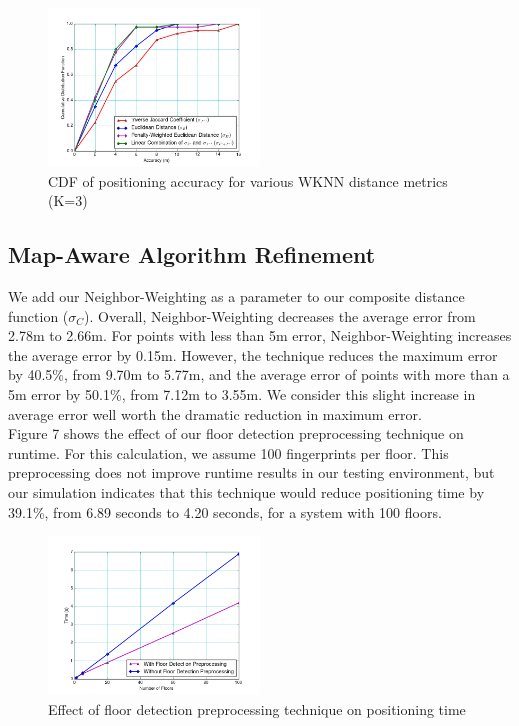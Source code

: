 \documentclass[conference]{IEEEtran}
\begin{document}
\begin{figure}[h!]
  \centering
    \includegraphics[width=0.5\textwidth]{distance_comparison.png}
    \caption{CDF of positioning accuracy for various WKNN distance metrics (K=3)}
\end{figure}


\subsection{Map-Aware Algorithm Refinement}

We add our Neighbor-Weighting as a parameter to our composite distance function ($\sigma_C$). Overall, Neighbor-Weighting decreases the average error from 2.78m to 2.66m. For points with less than 5m error, Neighbor-Weighting increases the average error by 0.15m. However, the technique reduces the maximum error by 40.5\%, from 9.70m to 5.77m, and the average error of points with more than a 5m error by 50.1\%, from 7.12m to 3.55m. We consider this slight increase in average error well worth the dramatic reduction in maximum error.\\		
\indent Figure 7 shows the effect of our floor detection preprocessing technique on runtime. For this calculation, we assume 100 fingerprints per floor. This preprocessing does not improve runtime results in our testing environment, but our simulation indicates that this technique would reduce positioning time by 39.1\%, from 6.89 seconds to 4.20 seconds, for a system with 100 floors.

\begin{figure}[h!]
  \centering
    \includegraphics[width=0.5\textwidth]{time_comparison.png}
   \caption{Effect of floor detection preprocessing technique on positioning time}
\end{figure}
\end{document}
